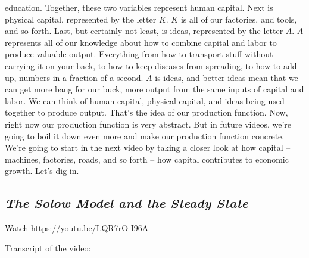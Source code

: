 {education. Together, these two variables represent human capital. Next is physical capital, represented by the letter $K$. $K$ is all of our factories, and tools,
and so forth.
Last, but certainly not least, is ideas, represented by the letter $A$. $A$ represents all of our knowledge about how to combine capital and labor to produce
valuable output. Everything from how to transport stuff without carrying it on your back, to how to keep diseases from spreading, to how to add up,
numbers in a fraction of a second. $A$ is ideas, and better ideas mean that we can get more bang for our buck, more output from the same inputs of
 capital and labor. We can think of human capital, physical capital, and ideas being used together to produce output. That's the idea of our production
function. Now, right now our production function is very abstract. But in future videos, we’re going to boil it down even more and make our production
function concrete. We're going to start in the next video by taking a closer look at how capital -- machines, factories, roads, and so forth -- how capital
contributes to economic growth. Let's dig in.
}

\subsection{\tv \textit{The Solow Model and the Steady State}}

Watch \tv	\url{https://youtu.be/LQR7rO-I96A}

	
	Transcript of the video:
	
